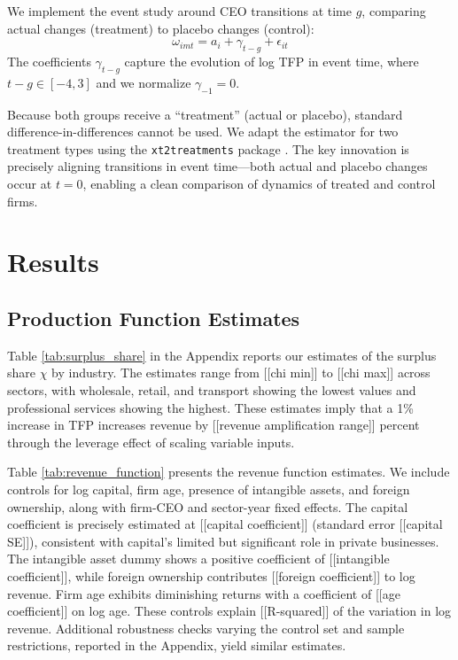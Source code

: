 \documentclass[11pt,a4paper]{article}
\begin{document}
We implement the event study around CEO transitions at time $g$, comparing actual changes (treatment) to placebo changes (control):
\begin{equation}
\omega_{imt} = a_i + \gamma_{t-g} + \epsilon_{it}
\end{equation}
The coefficients $\gamma_{t-g}$ capture the evolution of log TFP in event time, where $t-g \in [-4, 3]$ and we normalize $\gamma_{-1} = 0$.

Because both groups receive a ``treatment'' (actual or placebo), standard difference-in-differences cannot be used. We adapt the \citet{Callaway2021JoLE} estimator for two treatment types using the \texttt{xt2treatments} package \citep{Koren2024xt2treatments}. The key innovation is precisely aligning transitions in event time—both actual and placebo changes occur at $t=0$, enabling a clean comparison of dynamics of treated and control firms.


\section{Results}

\subsection{Production Function Estimates}

Table \ref{tab:surplus_share} in the Appendix reports our estimates of the surplus share $\chi$ by industry. The estimates range from [[chi min]] to [[chi max]] across sectors, with wholesale, retail, and transport showing the lowest values and professional services showing the highest. These estimates imply that a 1\% increase in TFP increases revenue by [[revenue amplification range]] percent through the leverage effect of scaling variable inputs.

Table \ref{tab:revenue_function} presents the revenue function estimates. We include controls for log capital, firm age, presence of intangible assets, and foreign ownership, along with firm-CEO and sector-year fixed effects. The capital coefficient is precisely estimated at [[capital coefficient]] (standard error [[capital SE]]), consistent with capital's limited but significant role in private businesses. The intangible asset dummy shows a positive coefficient of [[intangible coefficient]], while foreign ownership contributes [[foreign coefficient]] to log revenue. Firm age exhibits diminishing returns with a coefficient of [[age coefficient]] on log age. These controls explain [[R-squared]] of the variation in log revenue. Additional robustness checks varying the control set and sample restrictions, reported in the Appendix, yield similar estimates.
\end{document}
